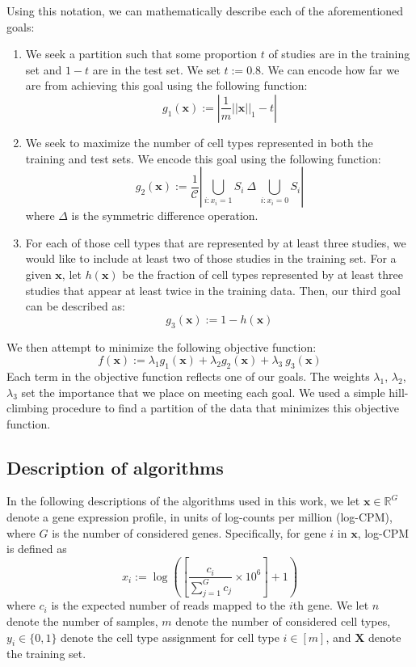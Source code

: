 Using this notation, we can mathematically describe each of the aforementioned goals:
\begin{enumerate}
\item We seek a partition such that some proportion $t$ of studies are in the training set and $1-t$ are in the test set.  We set $t := 0.8$.  We can encode how far we are from achieving this goal using the following function:
$$g_1(\boldsymbol{x}) := \left| \frac{1}{m}||\boldsymbol{x}||_1 - t \right|$$
 \item We seek to maximize the number of cell types represented in both the training and test sets. We encode this goal using the following function: $$g_2(\boldsymbol{x}) := \frac{1}{\mathcal{C}}
\left|\bigcup_{i : x_i = 1} S_i \ \Delta \ \bigcup_{i : x_i = 0} S_i\right|$$
where $\Delta$ is the symmetric difference operation.  
\item For each of those cell types that are represented by at least three studies, we would like to include at least two of those studies in the training set. For a given $\boldsymbol{x}$, let $h(\boldsymbol{x})$ be the fraction of cell types represented by at least three studies that appear at least twice in the training data. Then, our third goal can be described as:
$$g_3(\boldsymbol{x}) := 1 - h(\boldsymbol{x})$$
\end{enumerate}
We then attempt to minimize the following objective function:
$$f(\boldsymbol{x}) := \lambda_1 g_1(\boldsymbol{x})  + \lambda_2 g_2(\boldsymbol{x}) + \lambda_3\ g_3(\boldsymbol{x})$$
Each term in the objective function reflects one of our goals.  The weights $\lambda_1$, $\lambda_2$, $\lambda_3$ set the importance that we place on meeting each goal.  We used a simple hill-climbing procedure to find a partition of the data that minimizes this objective function.

\subsection*{Description of algorithms}

In the following descriptions of the algorithms used in this work, we let $\boldsymbol{x} \in \mathbb{R}^G$ denote a gene expression profile, in units of log-counts per million (log-CPM), where $G$ is the number of considered genes.  Specifically, for gene $i$ in $\boldsymbol{x}$, log-CPM is defined as
$$x_i := \log\left(\left[\frac{c_i}{\sum_{j=1}^G c_j} \times 10^6\right] + 1\right)$$ where $c_i$ is the expected number of reads mapped to the $i$th gene.  We let $n$ denote the number of samples, $m$ denote the number of considered cell types, $y_i \in \{0, 1\}$ denote the cell type assignment for cell type $i \in [m]$, and $\boldsymbol{X}$ denote the training set.

